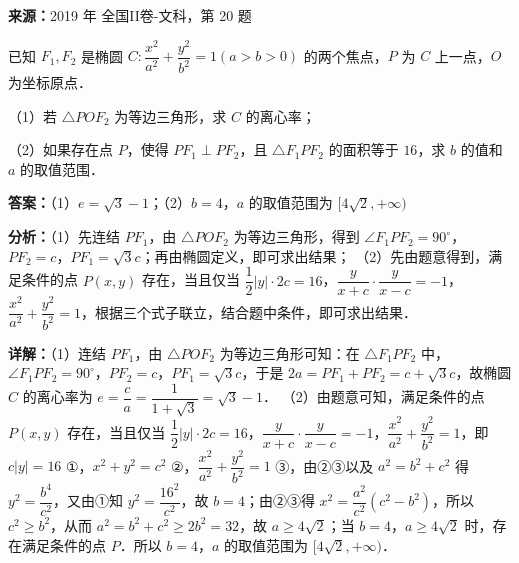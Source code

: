 \begin{question}[points=12]
\textbf{来源：}2019 年 全国II卷-文科，第 20 题\par
已知 $F_1,F_2$ 是椭圆 $C:\dfrac{x^2}{a^2}+\dfrac{y^2}{b^2}=1(a>b>0)$ 的两个焦点，$P$ 为 $C$ 上一点，$O$ 为坐标原点．

（1）若 $\triangle POF_2$ 为等边三角形，求 $C$ 的离心率；

（2）如果存在点 $P$，使得 $PF_1\perp PF_2$，且 $\triangle F_1PF_2$ 的面积等于 $16$，求 $b$ 的值和 $a$ 的取值范围．
\begin{solution}
\textbf{答案：}（1）$e=\sqrt{3}-1$；（2）$b=4$，$a$ 的取值范围为 $[4\sqrt{2},+\infty)$

\textbf{分析：}（1）先连结 $PF_1$，由 $\triangle POF_2$ 为等边三角形，得到 $\angle F_1PF_2=90^\circ$，$PF_2=c$，$PF_1=\sqrt{3}c$；再由椭圆定义，即可求出结果；
（2）先由题意得到，满足条件的点 $P(x,y)$ 存在，当且仅当 $\dfrac{1}{2}|y|\cdot2c=16$，$\dfrac{y}{x+c}\cdot\dfrac{y}{x-c}=-1$，$\dfrac{x^2}{a^2}+\dfrac{y^2}{b^2}=1$，根据三个式子联立，结合题中条件，即可求出结果．

\textbf{详解：}（1）连结 $PF_1$，由 $\triangle POF_2$ 为等边三角形可知：在 $\triangle F_1PF_2$ 中，$\angle F_1PF_2=90^\circ$，$PF_2=c$，$PF_1=\sqrt{3}c$，于是 $2a=PF_1+PF_2=c+\sqrt{3}c$，故椭圆 $C$ 的离心率为 $e=\dfrac{c}{a}=\dfrac{1}{1+\sqrt{3}}=\sqrt{3}-1$．
（2）由题意可知，满足条件的点 $P(x,y)$ 存在，当且仅当 $\dfrac{1}{2}|y|\cdot2c=16$，$\dfrac{y}{x+c}\cdot\dfrac{y}{x-c}=-1$，$\dfrac{x^2}{a^2}+\dfrac{y^2}{b^2}=1$，即 $c|y|=16$ ①，$x^2+y^2=c^2$ ②，$\dfrac{x^2}{a^2}+\dfrac{y^2}{b^2}=1$ ③，由②③以及 $a^2=b^2+c^2$ 得 $y^2=\dfrac{b^4}{c^2}$，又由①知 $y^2=\dfrac{16^2}{c^2}$，故 $b=4$；由②③得 $x^2=\dfrac{a^2}{c^2}(c^2-b^2)$，所以 $c^2\ge b^2$，从而 $a^2=b^2+c^2\ge 2b^2=32$，故 $a\ge 4\sqrt{2}$；当 $b=4$，$a\ge 4\sqrt{2}$ 时，存在满足条件的点 $P$．所以 $b=4$，$a$ 的取值范围为 $[4\sqrt{2},+\infty)$．
\end{solution}
\end{question}

